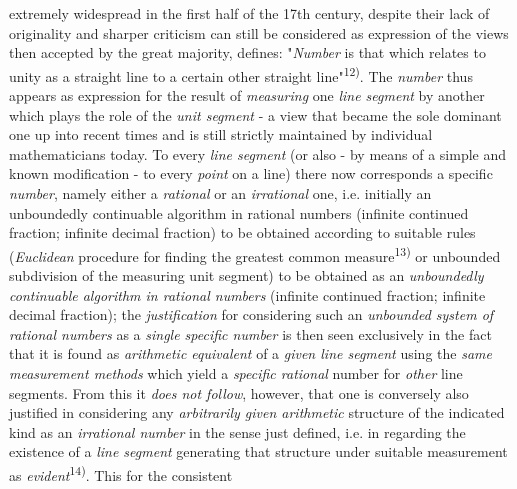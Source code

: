 \thispagestyle{fancy}

\vspace{0.5cm}

extremely widespread in the first half of the 17th century, despite their lack of originality and sharper criticism can still be considered as expression of the views then accepted by the great majority, defines: "\textit{Number} is that which relates to unity as a straight line to a certain other straight line"\textsuperscript{12)}. The \textit{number} thus appears as expression for the result of \textit{measuring} one \textit{line segment} by another which plays the role of the \textit{unit segment} - a view that became the sole dominant one up into recent times and is still strictly maintained by individual mathematicians today. To every \textit{line segment} (or also - by means of a simple and known modification - to every \textit{point} on a line) there now corresponds a specific \textit{number}, namely either a \textit{rational} or an \textit{irrational} one, i.e. initially an unboundedly continuable algorithm in rational numbers (infinite continued fraction; infinite decimal fraction) to be obtained according to suitable rules (\textit{Euclidean} procedure for finding the greatest common measure\textsuperscript{13)} or unbounded subdivision of the measuring unit segment) to be obtained as an \textit{unboundedly continuable algorithm in rational numbers} (infinite continued fraction; infinite decimal fraction); the \textit{justification} for considering such an \textit{unbounded system of rational numbers} as a \textit{single specific number} is then seen exclusively in the fact that it is found as \textit{arithmetic equivalent} of a \textit{given line segment} using the \textit{same measurement methods} which yield a \textit{specific rational} number for \textit{other} line segments. From this it \textit{does not follow}, however, that one is conversely also justified in considering any \textit{arbitrarily given arithmetic} structure of the indicated kind as an \textit{irrational number} in the sense just defined, i.e. in regarding the existence of a \textit{line segment} generating that structure under suitable measurement as \textit{evident}\textsuperscript{14)}. This for the consistent

